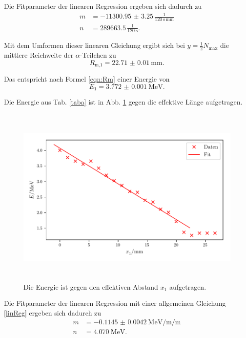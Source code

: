 \noindent Die Fitparameter der linearen Regression ergeben sich dadurch zu 
\begin{align*}
    m &= - \num{11300.95(325)} \,\frac{\text{1}}{\SI{120}{\second}\, \si{\milli\meter}} \\
    n &= \num{289663.5} \, \frac{\text{1}}{\SI{120}{\second}} .
\end{align*}


\noindent Mit dem Umformen dieser linearen Gleichung ergibt sich bei $y = \frac{1}{2} N_\text{max}$ die mittlere Reichweite der $\alpha$-Teilchen zu %
\begin{equation*}
    R_\text{m,1} = \SI{22.71(1)}{\milli\meter}.
\end{equation*}

\noindent Das entspricht nach Formel \eqref{eqn:Rm} einer Energie von %
\begin{equation*}
    E_1 = \SI{3.772(1)}{\mega\electronvolt}.
\end{equation*}

\noindent Die Energie aus Tab. \ref{taba} ist in Abb. \ref{fig:energie1} gegen die effektive Länge aufgetragen.
\begin{figure}
    \centering
    \includegraphics[width=15cm, height=9cm]{build/plotb.pdf}
    \caption{Die Energie ist gegen den effektiven Abstand $x_1$ aufgetragen.}
    \label{fig:energie1}
\end{figure}

\noindent Die Fitparameter der linearen Regression mit einer allgemeinen Gleichung \eqref{linReg} ergeben sich dadurch zu 
\begin{align*}
    m &= - \SI{0.1145(42)}{\mega\electronvolt\per\milli\per\meter} \\
    n &= \SI{4.070}{\mega\electronvolt} .
\end{align*}

